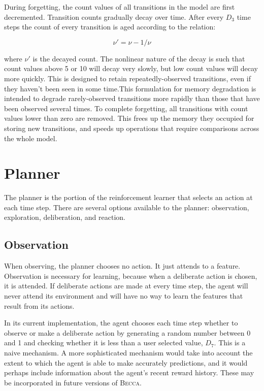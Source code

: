 During forgetting, the count values of all transitions in the model are first decremented. Transition counts gradually decay over time. After every $D_3$ time steps  the count of every transition is aged according to the relation:

\begin{equation}
\nu' = \nu - 1/\nu
\end{equation}

where $\nu'$ is the decayed count. The nonlinear nature of the decay is such that count values above 5 or 10 will decay very slowly, but low count values will decay more quickly. This is designed to retain repeatedly-observed transitions, even if they haven't been seen in some time.This formulation for memory degradation is intended to degrade rarely-observed transitions more rapidly than those that have been observed several times.  To complete forgetting, all transitions with count values lower than zero are removed. This frees up the memory they occupied for storing new transitions, and speeds up operations that require comparisons across the whole model.


\section{Planner}
The planner is the portion of the reinforcement learner that selects an action at each time step. There are several options available to the planner: observation, exploration, deliberation, and reaction.

\subsection{Observation}
When observing, the planner chooses no action. It just attends to a feature. Observation is necessary for learning, because when a deliberate action is chosen, it is attended. If deliberate actions are made at every time step, the agent will never attend its environment and will have no way to learn the features that result from its actions.

In its current implementation, the agent chooses each time step whether to observe or make a deliberate action by generating a random number between 0 and 1 and checking whether it is less than a user selected value, $D_7$. This is a naive mechanism. A more sophisticated mechanism would take into account the extent to which the agent is able to make accurately predictions, and it would perhaps include information about the agent's recent reward history. These may be incorporated in future versions of \textsc{Becca}.

